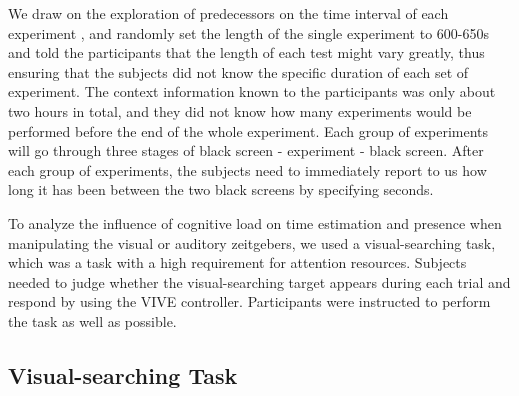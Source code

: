 \documentclass[sigconf]{acmart}
\begin{document}
We draw on the exploration of predecessors on the time interval of each experiment \cite{schatzschneider2016turned}, and randomly set the length of the single experiment to 600-650s and told the participants that the length of each test might vary greatly, thus ensuring that the subjects did not know the specific duration of each set of experiment. The context information known to the participants was only about two hours in total, and they did not know how many experiments would be performed before the end of the whole experiment. Each group of experiments will go through three stages of black screen - experiment - black screen. After each group of experiments, the subjects need to immediately report to us how long it has been between the two black screens by specifying seconds.


To analyze the influence of cognitive load on time estimation and presence when manipulating the visual or auditory zeitgebers, we used a visual-searching task, which was a task with a high requirement for attention resources. Subjects needed to judge whether the visual-searching target appears during each trial and respond by using the VIVE controller. Participants were instructed to perform the task as well as possible.%

\subsection*{Visual-searching Task}
\end{document}
